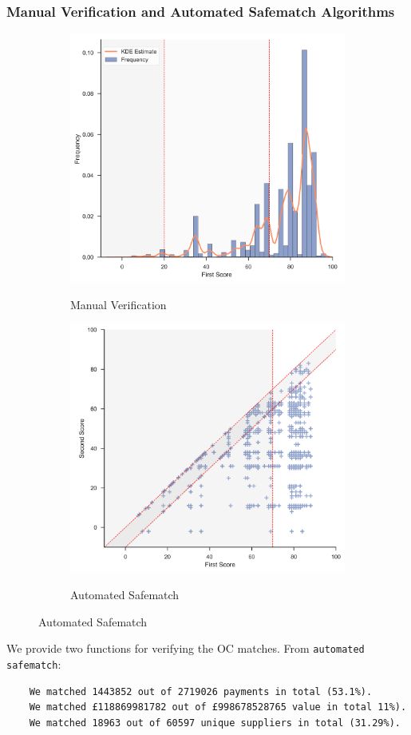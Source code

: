 \documentclass[11pt]{beamer}
\begin{document}
\begin{frame}[fragile]
\frametitle{Manual Verification and Automated Safematch Algorithms}
\begin{figure}
\centering
\begin{subfigure}{.5\textwidth}
  \centering
    \caption{Manual Verification}
  \includegraphics[width=.8\linewidth]{image1-0.png}
  \label{fig:sub1}
\end{subfigure}%
\begin{subfigure}{.5\textwidth}
  \centering
    \caption{Automated Safematch}
  \includegraphics[width=.8\linewidth]{image1-1.png}
  \label{fig:sub2}
\end{subfigure}
\label{fig:test}
\end{figure}\scriptsize
We provide two functions for verifying the OC matches. From \texttt{automated safematch}:
\begin{verbatim}
    We matched 1443852 out of 2719026 payments in total (53.1%).
    We matched £118869981782 out of £998678528765 value in total 11%).
    We matched 18963 out of 60597 unique suppliers in total (31.29%).
\end{verbatim}
\end{frame}
\end{document}
